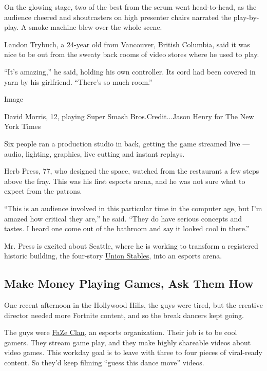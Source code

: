 On the glowing stage, two of the best from the scrum went head-to-head,
as the audience cheered and shoutcasters on high presenter chairs
narrated the play-by-play. A smoke machine blew over the whole scene.

Landon Trybuch, a 24-year old from Vancouver, British Columbia, said it
was nice to be out from the sweaty back rooms of video stores where he
used to play.

``It's amazing,'' he said, holding his own controller. Its cord had been
covered in yarn by his girlfriend. ``There's so much room.''

Image

David Morris, 12, playing Super Smash Bros.Credit...Jason Henry for The
New York Times

Six people ran a production studio in back, getting the game streamed
live --- audio, lighting, graphics, live cutting and instant replays.

Herb Press, 77, who designed the space, watched from the restaurant a
few steps above the fray. This was his first esports arena, and he was
not sure what to expect from the patrons.

``This is an audience involved in this particular time in the computer
age, but I'm amazed how critical they are,'' he said. ``They do have
serious concepts and tastes. I heard one come out of the bathroom and
say it looked cool in there.''

Mr. Press is excited about Seattle, where he is working to transform a
registered historic building, the four-story
\href{https://www.nps.gov/nr/feature/places/13000210.htm}{Union
Stables}, into an esports arena.

\hypertarget{make-money-playing-games-ask-them-how}{%
\subsection{Make Money Playing Games, Ask Them
How}\label{make-money-playing-games-ask-them-how}}

One recent afternoon in the Hollywood Hills, the guys were tired, but
the creative director needed more Fortnite content, and so the break
dancers kept going.

The guys were \href{https://fazeclan.com/}{FaZe Clan}, an esports
organization. Their job is to be cool gamers. They stream game play, and
they make highly shareable videos about video games. This workday goal
is to leave with three to four pieces of viral-ready content. So they'd
keep filming ``guess this dance move'' videos.

